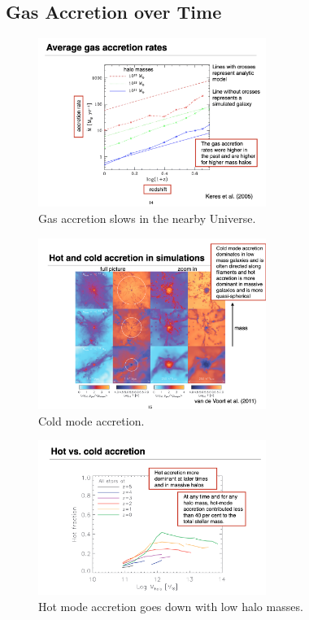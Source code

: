 \documentclass{article}
\begin{document}
\subsection{Gas Accretion over Time}

\begin{figure}
    \centering
    \includegraphics[width=0.66\textwidth]{figs/Screen Shot 2021-10-08 at 10.46.59 AM.png}
    \caption{Gas accretion slows in the nearby Universe. }
    \label{fig:gasacc}
\end{figure}

\begin{figure}
    \centering
    \includegraphics[width=0.66\textwidth]{figs/Screen Shot 2021-10-08 at 10.49.31 AM.png}
    \caption{Cold mode accretion.}
    \label{fig:cold_mode_acc}
\end{figure}

\begin{figure}
    \centering
    \includegraphics[width=0.66\textwidth]{figs/Screen Shot 2021-10-08 at 10.52.12 AM.png}
    \caption{Hot mode accretion goes down with low halo masses.}
    \label{fig:coldvshot_accre}
\end{figure}
\end{document}
